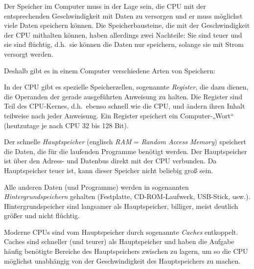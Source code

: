 Der Speicher im Computer muss in der Lage sein, die CPU mit der entsprechenden
Geschwindigkeit mit Daten zu versorgen und er muss möglichst viele Daten
speichern können. Die Speicherbausteine, die mit der Geschwindigkeit der CPU
mithalten können, haben allerdings zwei Nachteile: Sie sind teuer und sie sind
flüchtig, d.h.\ sie können die Daten nur speichern, solange sie mit Strom
versorgt werden.

\begin{minipage}{1.0\textwidth}
Deshalb gibt es in einem Computer verschiedene Arten von Speichern:

\begin{compactitem}
\item In der CPU gibt es spezielle Speicherzellen, sogenannte \emph{Register},
die dazu dienen, die Operanden der gerade ausgeführten Anweisung zu halten. Die
Register sind Teil des CPU-Kernes, d.h.\ ebenso schnell wie die CPU, und ändern
ihren Inhalt teilweise nach jeder Anweisung. Ein Register speichert ein
Computer-„Wort“ (heutzutage je nach CPU 32 bis 128 Bit).

\item Der schnelle \emph{Hauptspeicher} (englisch \emph{RAM} = \emph{Random
Access Memory}) speichert die Daten, die für die laufenden Programme benötigt
werden. Der Hauptspeicher ist über den Adress- und Datenbus direkt mit der CPU
verbunden. Da Hauptspeicher teuer ist, kann dieser Speicher nicht beliebig groß
sein.

\item Alle anderen Daten (und Programme) werden in sogenannten
\emph{Hintergrundspeichern} gehalten (Festplatte, CD-ROM-Laufwerk, USB-Stick,
usw.). Hintergrundspeicher sind langsamer als Hauptspeicher, billiger, meist
deutlich größer und nicht flüchtig.

\item Moderne CPUs sind vom Hauptspeicher durch sogenannte \emph{Caches}
entkoppelt. Caches sind schneller (und teurer) als Hauptspeicher und haben die
Aufgabe häufig benötigte Bereiche des Hauptspeichers zwischen zu lagern, um so
die CPU möglichst unabhängig von der Geschwindigkeit des Hauptspeichers zu
machen.
\end{compactitem}
\end{minipage}